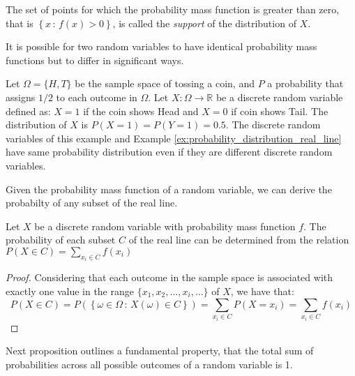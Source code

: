 The set of points for which the probability mass function is greater than zero, that is $\left\{ x \, : \, f \left( x \right) > 0 \right\}$, is called the \emph{support} of the distribution of $X$.

It is possible for two random variables to have identical probability mass functions but to differ in significant ways.

\begin{example}
Let $\Omega = \{H, T\}$ be the sample space of tossing a coin, and $P$ a probability that assigns $1/2$ to each outcome in $\Omega$. Let $X: \Omega \rightarrow \mathbb{R}$ be a discrete random variable defined as: $X = 1$ if the coin shows Head and $X = 0$ if coin shows Tail. The distribution of $X$ is $P(X = 1) = P(Y = 1) = 0.5$. The discrete random variables of this example and Example \ref{ex:probability_distribution_real_line} have same probability distribution even if they are different discrete random variables.
\end{example}

Given the probability mass function of a random variable, we can derive the probabilty of any subset of the real line.

\begin{proposition}
Let $X$ be a discrete random variable with probability mass function $f$. The probability of each subset $C$ of the real line can be determined from the relation $P\left(X\in C\right)=\sum_{x_{i}\in C}f\left(x_{i}\right)$
\end{proposition}
\begin{proof}
Considering that each outcome in the sample space is associated with exactly one value in the range $\{ x_1, x_2, \ldots, x_i, \ldots \}$ of $X$, we have that:
\[
P\left(X\in C\right) = P \left( \left\{ \omega \in \Omega \,:\, X \left( \omega \right) \in C\right\} \right) = \sum_{x_{i}\in C} P\left( X = x_i \right) = \sum_{x_{i}\in C}f\left(x_{i}\right)
\]
\end{proof}

Next proposition outlines a fundamental property, that the total sum of probabilities across all possible outcomes of a random variable is 1.


